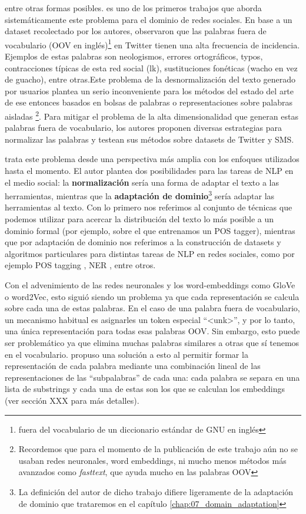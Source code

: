 entre otras formas posibles. \citet{han2011lexical} es uno de los primeros trabajos que aborda sistemáticamente este problema para el dominio de redes sociales. En base a un dataset recolectado por los autores, observaron que las palabras fuera de vocabulario (OOV en inglés)\footnote{fuera del vocabulario de un diccionario estándar de GNU en inglés} en Twitter tienen una alta frecuencia de incidencia. Ejemplos de estas palabras son neologismos, errores ortográficos, typos, contracciones típicas de esta red social (lk), sustituciones fonéticas (wacho en vez de guacho), entre otras.Este problema de la desnormalización del texto generado por usuarios plantea un serio inconveniente para los métodos del estado del arte de ese entonces basados en bolsas de palabras o representaciones sobre palabras aisladas \footnote{Recordemos que para el momento de la publicación de este trabajo aún no se usaban redes neuronales, word embeddings, ni mucho menos métodos más avanzados como \emph{fasttext}, que ayuda mucho en las palabras OOV}. Para mitigar el problema de la alta dimensionalidad que generan estas palabras fuera de vocabulario, los autores proponen diversas estrategias para normalizar las palabras y testean sus métodos sobre datasets de Twitter y SMS.

\citet{eisenstein2013bad} trata este problema desde una perspectiva más amplia con los enfoques utilizados hasta el momento. El autor plantea dos posibilidades para las tareas de NLP en el medio social: la \textbf{normalización} sería una forma de adaptar el texto a las herramientas, mientras que la \textbf{adaptación de dominio}\footnote{La definición del autor de dicho trabajo difiere ligeramente de la adaptación de dominio que trataremos en el capítulo \ref{chap:07_domain_adaptation}} sería adaptar las herramientas al texto. Con lo primero nos referimos al conjunto de técnicas que podemos utilizar para acercar la distribución del texto lo más posible a un dominio formal (por ejemplo, sobre el que entrenamos un POS tagger), mientras que por adaptación de dominio nos referimos a la construcción de datasets y algoritmos particulares para distintas tareas de NLP en redes sociales, como por ejemplo POS tagging \cite{gimpel2010part}, NER \cite{ritter2011named}, entre otros.

Con el advenimiento de las redes neuronales y los word-embeddings como GloVe o word2Vec, esto siguió siendo un problema ya que cada representación se calcula sobre cada una de estas palabras. En el caso de una palabra fuera de vocabulario, un mecanismo habitual es asignarles un token especial ``<unk>'', y por lo tanto, una única representación para todas esas palabras OOV. Sin embargo, esto puede ser problemático ya que elimina muchas palabras similares a otras que sí tenemos en el vocabulario. \citet{bojanowski16} propuso una solución a esto al permitir formar la representación de cada palabra mediante una combinación lineal de las representaciones de las ``subpalabras'' de cada una: cada palabra se separa en una lista de substrings y cada una de estas son los que se calculan los embeddings (ver sección XXX para más detalles).

